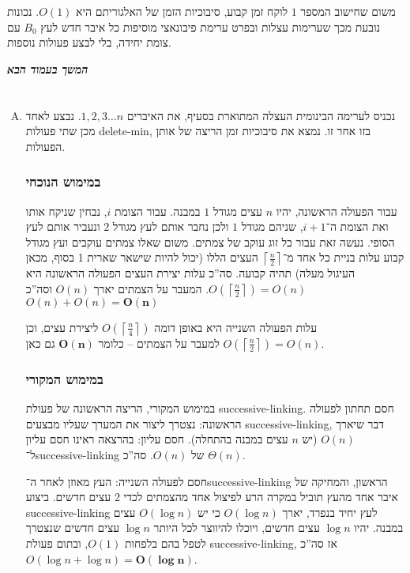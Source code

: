 \documentclass[]{article}
\newcommand\npage {\vfil {\hfil \textbf{\textit{המשך בעמוד הבא}}} \hfil \vfil \pagebreak}
\newcommand\rc    {\right\rceil}
\newcommand\lc    {\left\lceil}
\newcommand\ceil  [1] {\lc #1 \rc}
\newcommand\logn  {\log n}
\newcommand\cl [1]    {\left ( #1 \right )}
\theoremstyle{definition}
\begin{document}
\begin{enumerate}[A.]
        משום שחישוב המספר $1$ לוקח זמן קבוע, סיבוכיות הזמן של האלגוריתם היא $O(1)$. נכונות נובעת מכך שערימות עצלות ובפרט ערימת פיבונאצי מוסיפות כל איבר חדש לעץ $B_0$ עם צומת יחידה, בלי לבצע פעולות נוספות. 
    \end{enumerate}
    
    \npage
    \section{}
    \begin{enumerate}[A.]
        \item נכניס לערימה הבינומית העצלה המתוארת בסעיף, את האיברים $1, 2, 3 \dots n$. נבצע לאחד מכן שתי פעולות delete-min, בזו אחר זו. נמצא את סיבוכיות זמן הריצה של אותן הפעולות. 
        
        \subsubsection*{במימוש הנוכחי}
        עבור הפעולה הראשונה, יהיו $n$ עצים מגודל $1$ במבנה. עבור הצומת $i$, נבחין שניקח אותו ואת הצומת ה־$i + 1$, שניהם מגודל $1$ ולכן נחבר אותם לעץ מגודל $2$ ונעביר אותם לעץ הסופי. נעשה זאת עבור כל זוג עוקב של צמתים. משום שאלו צמתים עוקבים ועץ מגודל קבוע עלות בניית כל אחד מ־$\ceil{\frac{n}{2}}$ העצים הללו (יכול להיות שישאר שארית 1 בסוף, מכאן העיגול מעלה) תהיה קבועה. סה''כ עלות יצירת העצים הפעולה הראשונה היא $O\cl{\ceil{\frac{n}{2}}}  = O(n)$. המעבר על הצמתים יארך $O(n)$ וסה''כ $O(n) + O(n) = \bm{O(n)}$
        
        עלות הפעולה השנייה היא באופן דומה $O\cl{\ceil{\frac{n}{4}}}$ ליצירת עצים, וכן $O(\ceil{\frac{n}{2}}) = O(n)$ למעבר על הצמתים – כלומר $\bm{O(n)}$ גם כאן. 
        
        \subsubsection*{במימוש המקורי}
        במימוש המקורי, הריצה הראשונה של פעולת successive-linking. 
        חסם תחתון לפעולה הראשונה: נצטרך ליצור את המערך שעליו מבצעים successive-linking, דבר שיארך $O(n)$ (יש $n$ עצים במבנה בהתחלה). חסם עליון: בהרצאה ראינו חסם עליון ל־successive-linking של $O(n)$. סה''כ $\Theta(n)$. 
        
        חסם לפעולה השנייה: העץ מאוזן לאחר ה־successive-linking הראשון, והמחיקה של איבר אחד מהעץ תוביל במקרה הרע לפיצול אחד מהצמתים לכדי 2 עצים חדשים. ביצוע successive-linking לעץ יחיד בנפרד, יארך $O(\logn)$ כי יש $O(\logn)$ עצים במבנה. יהיו $\logn$ עצים חדשים, ויוכלו להיווצר לכל היותר $\logn$ עצים חדשים שנצטרך לטפל בהם בלפחות $O(1)$, ובתום פעולת successive-linking, אז סה''כ $O(\logn + \logn) = \bm{O(\logn)}$. 
        

\end{enumerate}
\end{document}
